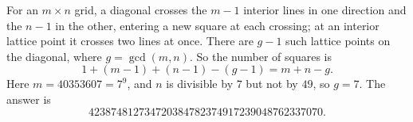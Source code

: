 For an $m\times n$ grid, a diagonal crosses the $m-1$ interior lines in one direction and the $n-1$ in the other, entering a new square at each crossing; at an interior lattice point it crosses two lines at once. There are $g-1$ such lattice points on the diagonal, where $g=\gcd(m,n)$. So the number of squares is
\[1+(m-1)+(n-1)-(g-1)=m+n-g.\]
Here $m=40353607=7^9$, and $n$ is divisible by $7$ but not by $49$, so $g=7$. The answer is
\[\boxed{423874812734720384782374917239048762337070}.\]
